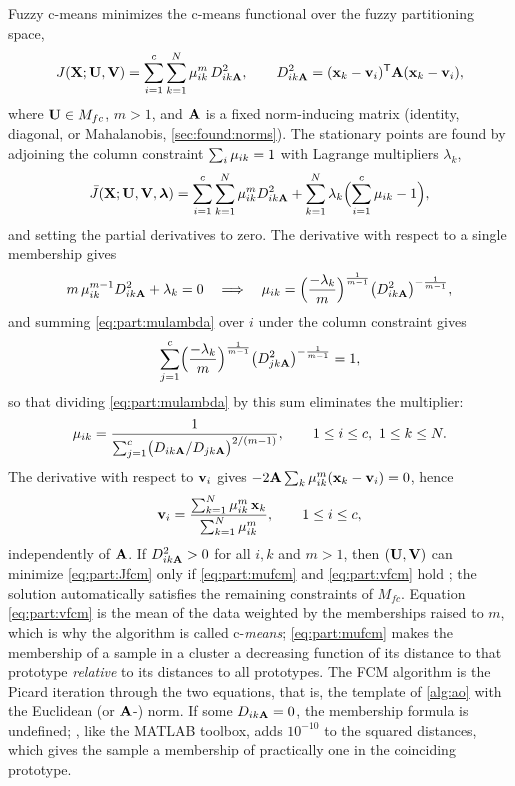 Fuzzy c-means \cite{dunn:1973:fcm,bezdek:1981} minimizes the c-means functional over the fuzzy partitioning space,
\begin{equation}
  J(\mathbf{X};\mathbf{U},\mathbf{V})=\sum_{i=1}^{c}\sum_{k=1}^{N}\mu_{ik}^m\,D^2_{ik\mathbf{A}},\qquad D^2_{ik\mathbf{A}}=(\mathbf{x}_k-\mathbf{v}_i)^{\mathsf{T}}\mathbf{A}(\mathbf{x}_k-\mathbf{v}_i),
  \label{eq:part:Jfcm}
\end{equation}
where $\mathbf{U}\in M_{fc}$, $m>1$, and $\mathbf{A}$ is a fixed norm-inducing matrix (identity, diagonal, or Mahalanobis, \cref{sec:found:norms}). The stationary points are found by adjoining the column constraint $\sum_i\mu_{ik}=1$ with Lagrange multipliers $\lambda_k$,
\begin{equation}
  \bar{J}(\mathbf{X};\mathbf{U},\mathbf{V},\boldsymbol\lambda)=\sum_{i=1}^{c}\sum_{k=1}^{N}\mu_{ik}^m D^2_{ik\mathbf{A}}+\sum_{k=1}^{N}\lambda_k\Bigl(\sum_{i=1}^{c}\mu_{ik}-1\Bigr),
  \label{eq:part:lagrange}
\end{equation}
and setting the partial derivatives to zero. The derivative with respect to a single membership gives
\begin{equation}
  m\,\mu_{ik}^{m-1}D^2_{ik\mathbf{A}}+\lambda_k=0\quad\Longrightarrow\quad \mu_{ik}=\Bigl(\frac{-\lambda_k}{m}\Bigr)^{\frac{1}{m-1}}\bigl(D^2_{ik\mathbf{A}}\bigr)^{-\frac{1}{m-1}},
  \label{eq:part:mulambda}
\end{equation}
and summing \eqref{eq:part:mulambda} over $i$ under the column constraint gives
\[
  \sum_{j=1}^{c}\Bigl(\frac{-\lambda_k}{m}\Bigr)^{\frac{1}{m-1}}\bigl(D^2_{jk\mathbf{A}}\bigr)^{-\frac{1}{m-1}}=1,
\]
so that dividing \eqref{eq:part:mulambda} by this sum eliminates the multiplier:
\begin{equation}
  \mu_{ik}=\frac{1}{\sum_{j=1}^{c}\bigl(D_{ik\mathbf{A}}/D_{jk\mathbf{A}}\bigr)^{2/(m-1)}},\qquad 1\le i\le c,\ 1\le k\le N.
  \label{eq:part:mufcm}
\end{equation}
The derivative with respect to $\mathbf{v}_i$ gives $-2\mathbf{A}\sum_k\mu_{ik}^m(\mathbf{x}_k-\mathbf{v}_i)=0$, hence
\begin{equation}
  \mathbf{v}_i=\frac{\sum_{k=1}^{N}\mu_{ik}^m\,\mathbf{x}_k}{\sum_{k=1}^{N}\mu_{ik}^m},\qquad 1\le i\le c,
  \label{eq:part:vfcm}
\end{equation}
independently of $\mathbf{A}$. If $D^2_{ik\mathbf{A}}>0$ for all $i,k$ and $m>1$, then $(\mathbf{U},\mathbf{V})$ can minimize \eqref{eq:part:Jfcm} only if \eqref{eq:part:mufcm} and \eqref{eq:part:vfcm} hold \cite{bezdek:1981}; the solution automatically satisfies the remaining constraints of $M_{fc}$. Equation \eqref{eq:part:vfcm} is the mean of the data weighted by the memberships raised to $m$, which is why the algorithm is called c-\emph{means}; \eqref{eq:part:mufcm} makes the membership of a sample in a cluster a decreasing function of its distance to that prototype \emph{relative} to its distances to all prototypes. The FCM algorithm is the Picard iteration through the two equations, that is, the template of \cref{alg:ao} with the Euclidean (or $\mathbf{A}$-) norm. If some $D_{ik\mathbf{A}}=0$, the membership formula is undefined; , like the MATLAB toolbox, adds $10^{-10}$ to the squared distances, which gives the sample a membership of practically one in the coinciding prototype.

